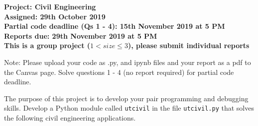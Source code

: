 \documentclass[a4paper,12pt]{article}
\begin{document}
\begin{centering}
	\textbf{
		Project: Civil Engineering\\
		Assigned: 29th October 2019\\
		Partial code deadline (Qs 1 - 4): 15th November 2019 at 5 PM\\
		Reports due: 29th November 2019 at 5 PM\\
		This is a group project ($ 1 < size \le 3$), please submit individual reports\\
	}
\end{centering}


\vspace{1em}

Note: Please upload your code as .py, and ipynb files and your report as a pdf to the Canvas page. Solve questions 1 - 4 (no report required) for partial code deadline.

\vspace{1em}
 
 The purpose of this project is to develop your pair programming and debugging skills. Develop a Python module called \verb|utcivil| in the file  \verb|utcivil.py| that solves the following civil engineering applications.
 
\end{document}
